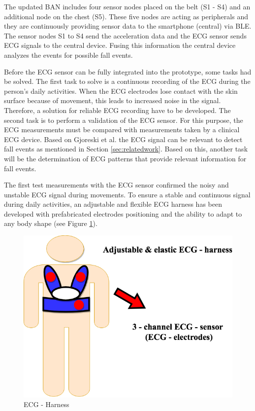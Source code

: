 \documentclass[10pt,journal,compsoc]{IEEEtran}
\begin{document}
The updated BAN includes four sensor nodes placed on the belt (S1 - S4) and an additional node on the chest (S5). These five nodes are acting as peripherals and they are continuously providing sensor data to the smartphone (central) via BLE. The sensor nodes S1 to S4 send the acceleration data and the ECG sensor sends ECG signals to the central device. Fusing this information the central device analyzes the events for possible fall events.

Before the ECG sensor can be fully integrated into the prototype, some tasks had be solved. The first task to solve is a continuous recording of the ECG during the person's daily activities. When the ECG electrodes lose contact with the skin surface because of movement, this leads to increased noise in the signal. Therefore, a solution for reliable ECG recording have to be developed. The second task is to perform a validation of the ECG sensor. For this purpose, the  ECG measurements must be compared with measurements taken by a clinical ECG device. Based on Gjoreski et al. \cite{Gjoreski2014} the ECG signal can be relevant to detect fall events as mentioned in Section \ref{sec:relatedwork}. Based on this, another task will be the determination of ECG patterns that provide relevant information for fall events.

The first test measurements with the ECG sensor confirmed the noisy and unstable ECG signal during movements. To ensure a stable and continuous signal during daily activities, an adjustable and flexible ECG harness has been developed with prefabricated electrodes positioning and the ability to adapt to any body shape (see Figure \ref{fig:ECGHarness}).
\begin{figure}[!ht]
	\centering
	\includegraphics[scale=0.22]{Images/ECG-Harness.png}
	\caption[ECG - Harness]{ECG - Harness}
	\label{fig:ECGHarness}
\end{figure}
\end{document}
